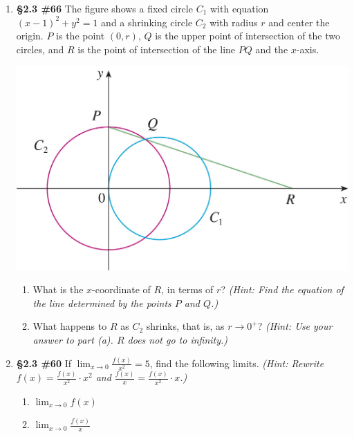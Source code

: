 \documentclass[%
]{article}
\begin{document}
\begin{enumerate}
\item {\bf \S2.3 \#66} The figure shows a fixed circle $C_1$ with equation $(x-1)^2+y^2=1$ and a shrinking circle $C_2$ with radius $r$ and center the origin.  $P$ is the point $(0,r)$, $Q$ is the upper point of intersection of the two circles, and $R$ is the point of intersection of the line $PQ$ and the $x$-axis.  
\begin{center}
\includegraphics[scale=5]{2-3_66Stewart8Ed}
\end{center}
	\begin{enumerate}
	\item What is the $x$-coordinate of $R$, in terms of $r$?  \emph{(Hint: Find the equation of the line determined by the points $P$ and $Q$.)}
	\item What happens to $R$ as $C_2$ shrinks, that is, as $r\to 0^+$?  \emph{(Hint: Use your answer to part (a).  $R$ does not go to infinity.)}
	\end{enumerate}

\item {\bf \S2.3 \#60} If $\displaystyle\lim_{x\to 0}\frac{f(x)}{x^2}=5$, find the following limits.  \emph{(Hint: Rewrite $f(x)=\frac{f(x)}{x^2}\cdot x^2$ and $\frac{f(x)}{x}=\frac{f(x)}{x^2}\cdot x$.)}
	\begin{enumerate}
	\item $\displaystyle\lim_{x\to 0}f(x)$
	\item $\displaystyle\lim_{x\to 0}\frac{f(x)}{x}$
	\end{enumerate}



\end{enumerate}
\end{document}
